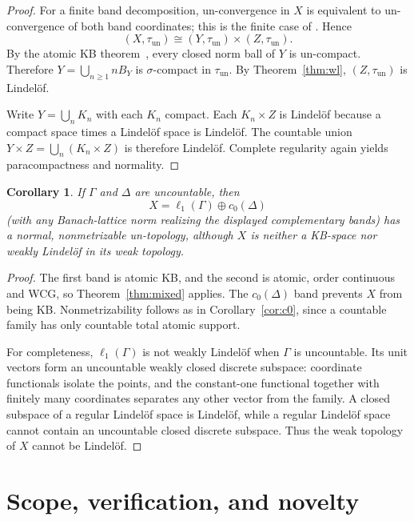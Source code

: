 \documentclass[11pt]{amsart}
\newtheorem{corollary}{Corollary}
\newcommand{\tun}{\tau_{\mathrm{un}}}
\begin{document}
\begin{proof}
For a finite band decomposition, un-convergence in $X$ is equivalent to
un-convergence of both band coordinates; this is the finite case of
\cite[Theorem~4.12]{KMT}.  Hence
\[
 (X,\tun)\cong (Y,\tun)\times(Z,\tun).
\]
By the atomic KB theorem~\cite[Theorem~7.5]{KMT}, every closed norm ball of
$Y$ is un-compact.  Therefore $Y=\bigcup_{n\ge1}nB_Y$ is $\sigma$-compact in
$\tun$.  By Theorem~\ref{thm:wl}, $(Z,\tun)$ is Lindel\"of.

Write $Y=\bigcup_n K_n$ with each $K_n$ compact.  Each
$K_n\times Z$ is Lindel\"of because a compact space times a Lindel\"of space
is Lindel\"of.  The countable union
$Y\times Z=\bigcup_n(K_n\times Z)$ is therefore Lindel\"of.  Complete
regularity again yields paracompactness and normality.
\end{proof}

\begin{corollary}\label{cor:mixed}
If $\Gamma$ and $\Delta$ are uncountable, then
\[
 X=\ell_1(\Gamma)\oplus c_0(\Delta)
\]
(with any Banach-lattice norm realizing the displayed complementary bands)
has a normal, nonmetrizable un-topology, although $X$ is neither a KB-space
nor weakly Lindel\"of in its weak topology.
\end{corollary}

\begin{proof}
The first band is atomic KB, and the second is atomic, order continuous and
WCG, so Theorem~\ref{thm:mixed} applies.  The $c_0(\Delta)$ band prevents $X$
from being KB.  Nonmetrizability follows as in Corollary~\ref{cor:c0}, since a
countable family has only countable total atomic support.

For completeness, $\ell_1(\Gamma)$ is not weakly Lindel\"of when $\Gamma$ is
uncountable.  Its unit vectors form an uncountable weakly closed discrete
subspace: coordinate functionals isolate the points, and the constant-one
functional together with finitely many coordinates separates any other
vector from the family.  A closed subspace of a regular Lindel\"of space is
Lindel\"of, while a regular Lindel\"of space cannot contain an uncountable
closed discrete subspace.  Thus the weak topology of $X$ cannot be
Lindel\"of.
\end{proof}

\section*{Scope, verification, and novelty}
\end{document}
